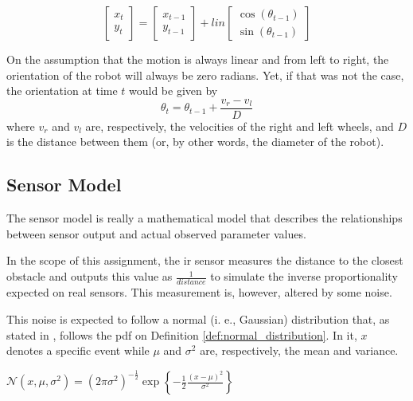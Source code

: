 \documentclass[runningheads]{llncs}
\begin{document}
\begin{equation*}
        \begin{bmatrix}
        x_t\\
        y_t
        \end{bmatrix} 
        =
        \begin{bmatrix}
        x_{t-1}\\
        y_{t-1}
        \end{bmatrix} 
        + lin
        \begin{bmatrix}
        \cos(\theta_{t-1})\\
        \sin(\theta_{t-1})
        \end{bmatrix} 
\end{equation*}

On the assumption that the motion is always linear and from left to right, the orientation of the robot will always be zero radians. Yet, if that was not the case, the orientation at time $t$ would be given by
%
\begin{equation*}
    \theta_t = \theta_{t-1} + \frac{v_r - v_l}{D}
\end{equation*}
%
where $v_r$ and $v_l$ are, respectively, the velocities of the right and left wheels, and $D$ is the distance between them (or, by other words, the diameter of the robot).

\subsection{Sensor Model}
\label{sec:sensor_model}

The sensor model is really a mathematical model that describes the relationships between sensor output and actual observed parameter values.

In the scope of this assignment, the \gls{ir} sensor measures the distance to the closest obstacle and outputs this value as $\frac{1}{distance}$ to simulate the inverse proportionality expected on real sensors. This measurement is, however, altered by some noise. 

This noise is expected to follow a normal (i. e., Gaussian) distribution that, as stated in \cite{thrun2005probabilistic}, follows the \gls{pdf} on Definition \ref{def:normal_distribution}. In it, $x$ denotes a specific event while $\mu$ and $\sigma^2$ are, respectively, the mean and variance.

\begin{definition}
    $\mathcal{N}(x, \mu, \sigma^2) = (2 \pi \sigma^2)^{-\frac{1}{2}} \exp \left\{ -\frac{1}{2} \frac{(x - \mu)^2}{\sigma^2} \right\}$
    \label{def:normal_distribution}
\end{definition}
\end{document}

